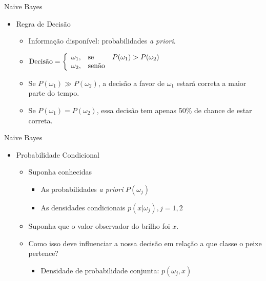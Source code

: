 \documentclass{libs/ufc_format}
\begin{document}
\begin{frame}{Naive Bayes}
    \begin{itemize}
        \item Regra de Decisão
            \begin{itemize}
                \item<2-> Informação disponível: \alert<2->{probabilidades \textit{a priori}}.
                \item<3->
                $\hbox{Decisão} = \left\{\begin{array}{rll}
                \omega_{1}, & \hbox{se} & P(\omega_{1}) > P(\omega_{2}) \\
                \omega_{2}, & \hbox{senão} &
                \end{array}\right.$
                \item<4-> Se $P(\omega_{1}) \gg P(\omega_{2})$, a decisão a favor de $\omega_{1}$ estará correta a maior parte do tempo.
				\item<5-> Se $P(\omega_{1}) = P(\omega_{2})$, essa decisão tem apenas 50\% de chance de estar correta.
            \end{itemize}
    \end{itemize}
\end{frame}

\begin{frame}{Naive Bayes}
    \begin{itemize}
        \item Probabilidade Condicional
            \begin{itemize}
                \justifying
                \item<2-> Suponha conhecidas
                    \begin{itemize}
                        \item<3-> As probabilidades \textit{a priori} $P(\omega_{j})$
                        \item<4-> As densidades condicionais $p(x|\omega_{j}), j = 1,2$
                    \end{itemize}
                \item<5-> Suponha que o valor observador do brilho foi $x$.
                \item<6-> Como isso deve influenciar a nossa decisão em relação a que classe o peixe pertence?
                    \begin{itemize}
                        \justifying
                        \item<7> Densidade de probabilidade conjunta: $p(\omega_{j},x)$
                    \end{itemize}
            \end{itemize}
    \end{itemize}
\end{frame}
\end{document}
